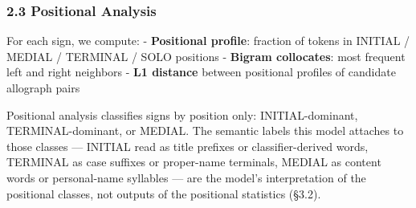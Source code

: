 \documentclass[
]{article}
\begin{document}
\subsubsection{2.3 Positional Analysis}\label{positional-analysis}

For each sign, we compute: - \textbf{Positional profile}: fraction of
tokens in INITIAL / MEDIAL / TERMINAL / SOLO positions - \textbf{Bigram
collocates}: most frequent left and right neighbors - \textbf{L1
distance} between positional profiles of candidate allograph pairs

Positional analysis classifies signs by position only: INITIAL-dominant,
TERMINAL-dominant, or MEDIAL. The semantic labels this model attaches to
those classes --- INITIAL read as title prefixes or classifier-derived
words, TERMINAL as case suffixes or proper-name terminals, MEDIAL as
content words or personal-name syllables --- are the model's
interpretation of the positional classes, not outputs of the positional
statistics (§3.2).
\end{document}
